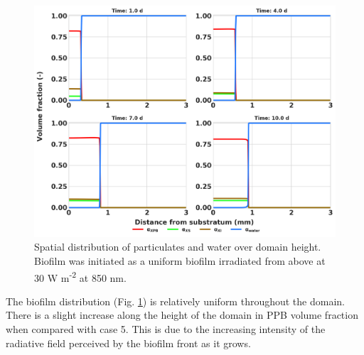 \begin{figure}[H]
    \centering
    \includegraphics[width=\textwidth,height=0.45\textheight]{Chap4/methods/output/case6.png}
    \caption{Spatial distribution of particulates and water over domain height. Biofilm was initiated as a uniform biofilm irradiated from above at 30 W m\textsuperscript{-2} at 850 nm.} 
    \label{fig:case6_dist_frac}
\end{figure}

The biofilm distribution (Fig. \ref{fig:case6_dist_frac}) is relatively uniform throughout the domain. There is a slight increase along the height of the domain in PPB volume fraction when compared with case 5. This is due to the increasing intensity of the radiative field perceived by the biofilm front as it grows. 





